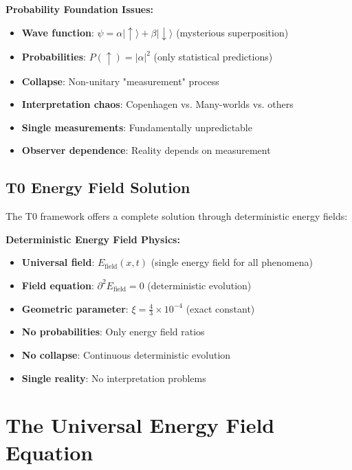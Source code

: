 \documentclass[12pt,a4paper]{report}
\begin{document}
\begin{tcolorbox}[colback=red!5!white,colframe=red!75!black,title=Standard QM Problems]
	\textbf{Probability Foundation Issues:}
	\begin{itemize}
		\item \textbf{Wave function}: $\psi = \alpha|\uparrow\rangle + \beta|\downarrow\rangle$ (mysterious superposition)
		\item \textbf{Probabilities}: $P(\uparrow) = |\alpha|^2$ (only statistical predictions)
		\item \textbf{Collapse}: Non-unitary "measurement" process
		\item \textbf{Interpretation chaos}: Copenhagen vs. Many-worlds vs. others
		\item \textbf{Single measurements}: Fundamentally unpredictable
		\item \textbf{Observer dependence}: Reality depends on measurement
	\end{itemize}
\end{tcolorbox}

\subsection{T0 Energy Field Solution}
\label{subsec:t0_solution}

The T0 framework offers a complete solution through deterministic energy fields:

\begin{tcolorbox}[colback=blue!5!white,colframe=blue!75!black,title=T0 Deterministic Foundation]
	\textbf{Deterministic Energy Field Physics:}
	\begin{itemize}
		\item \textbf{Universal field}: $E_{\text{field}}(x,t)$ (single energy field for all phenomena)
		\item \textbf{Field equation}: $\partial^2 E_{\text{field}} = 0$ (deterministic evolution)
		\item \textbf{Geometric parameter}: $\xi = \frac{4}{3} \times 10^{-4}$ (exact constant)
		\item \textbf{No probabilities}: Only energy field ratios
		\item \textbf{No collapse}: Continuous deterministic evolution
		\item \textbf{Single reality}: No interpretation problems
	\end{itemize}
\end{tcolorbox}

\section{The Universal Energy Field Equation}
\label{sec:universal_field_equation}
\end{document}
